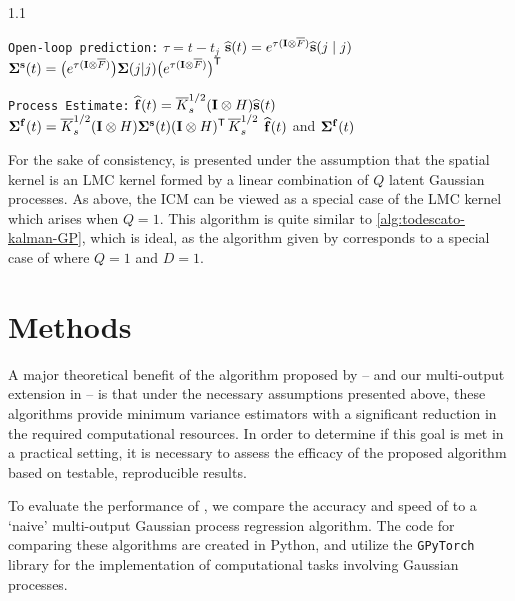 \documentclass[10pt]{article}
\numberwithin{equation}{section}
\begin{document}
\begin{algorithm}
\begin{spacing}{1.1}
\begin{algorithmic}[1]
        \Statex \texttt{Open-loop prediction:}
        \State $\tau = t - t_j$
        \State $\widehat{\mathbf{s}}(t) = e^{\tau(\mathbf{I} \otimes \overline{F})}\widehat{\mathbf{s}}(j \mid j)$
        \State $\bm{\Sigma}^{\mathbf{s}}(t) = \big(e^{\tau(\mathbf{I} \otimes \overline{F})}\big)\bm{\Sigma}(j|j)\big(e^{\tau(\mathbf{I} \otimes \overline{F})}\big)^{\scriptstyle{\mathsf{T}}}$

        \Statex \texttt{Process Estimate:}
        \State $\widehat{\mathbf{f}}(t) = \overline{K}_{s}^{1/2}(\mathbf{I} \otimes H)\widehat{\mathbf{s}}(t)$
        \State $\bm{\Sigma}^{\mathbf{f}}(t) = \overline{K}_{s}^{1/2}(\mathbf{I} \otimes H)\bm{\Sigma}^{\mathbf{s}}(t)(\mathbf{I} \otimes H)^{\scriptstyle{\mathsf{T}}}\,\overline{K}_{s}^{1/2}$
        \State \Return $\widehat{\mathbf{f}}(t)$ and $\bm{\Sigma}^{\mathbf{f}}(t)$
    \end{algorithmic}
    \end{spacing}
\end{algorithm}

For the sake of consistency,  is presented under the assumption that the spatial kernel is an LMC kernel formed by a linear combination of $Q$ latent Gaussian processes. As above, the ICM can be viewed as a special case of the LMC kernel which arises when $Q = 1$. This algorithm is quite similar to \cref{alg:todescato-kalman-GP}, which is ideal, as the algorithm given by \citeauthor{Todescato-Efficient-2020} corresponds to a special case of  where $Q = 1$ and $D = 1$. 

\clearpage
\section{Methods}
\label{sec:methods}

A major theoretical benefit of the algorithm proposed by \citeauthor{Todescato-Efficient-2020} -- and our multi-output extension in  -- is that under the necessary assumptions presented above, these algorithms provide minimum variance estimators with a significant reduction in the required computational resources. In order to determine if this goal is met in a practical setting, it is necessary to assess the efficacy of the proposed algorithm based on testable, reproducible results.

To evaluate the performance of , we compare the accuracy and speed of  to a `naive' multi-output Gaussian process regression algorithm. The code for comparing these algorithms are created in Python, and utilize the \texttt{GPyTorch} library \citep{GPyTorch-Library-2018} for the implementation of computational tasks involving Gaussian processes.
\end{document}
